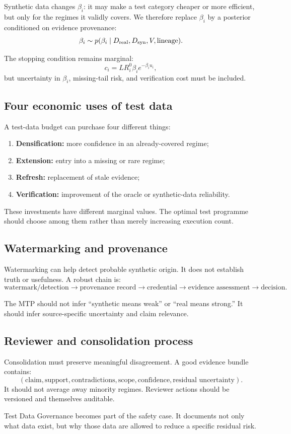 Synthetic data changes $\beta_i$: it may make a test category cheaper or more efficient, but only for the regimes it validly covers. We therefore replace $\beta_i$ by a posterior conditioned on evidence provenance:
\[
\beta_i\sim p(\beta_i\mid D_{\mathrm{real}},D_{\mathrm{syn}},V,\text{lineage}).
\]

The stopping condition remains marginal:
\[
c_i
=L R_i^0\beta_i e^{-\beta_i u_i},
\]
but uncertainty in $\beta_i$, missing-tail risk, and verification cost must be included.

\subsection{Four economic uses of test data}

A test-data budget can purchase four different things:

\begin{enumerate}[leftmargin=*]
  \item \textbf{Densification:} more confidence in an already-covered regime;
  \item \textbf{Extension:} entry into a missing or rare regime;
  \item \textbf{Refresh:} replacement of stale evidence;
  \item \textbf{Verification:} improvement of the oracle or synthetic-data reliability.
\end{enumerate}

These investments have different marginal values. The optimal test programme should choose among them rather than merely increasing execution count.

\subsection{Watermarking and provenance}

Watermarking can help detect probable synthetic origin. It does not establish truth or usefulness. A robust chain is:
\[
\text{watermark/detection}
\rightarrow
\text{provenance record}
\rightarrow
\text{credential}
\rightarrow
\text{evidence assessment}
\rightarrow
\text{decision}.
\]

The MTP should not infer ``synthetic means weak'' or ``real means strong.'' It should infer source-specific uncertainty and claim relevance.

\subsection{Reviewer and consolidation process}

Consolidation must preserve meaningful disagreement. A good evidence bundle contains:
\[
(\text{claim},\text{support},\text{contradictions},\text{scope},\text{confidence},\text{residual uncertainty}).
\]
It should not average away minority regimes. Reviewer actions should be versioned and themselves auditable.

\begin{keyidea}
Test Data Governance becomes part of the safety case. It documents not only what data exist, but why those data are allowed to reduce a specific residual risk.
\end{keyidea}
